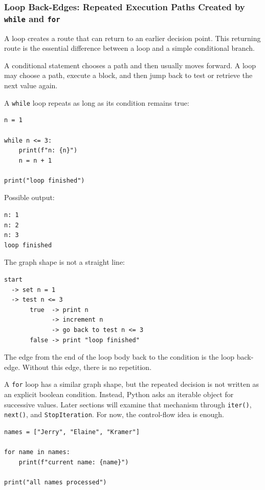\documentclass[a4paper,twoside]{report}
\begin{document}
\subsubsection{Loop Back-Edges: Repeated Execution Paths Created by \texttt{while} and \texttt{for}}

A loop creates a route that can return to an earlier decision point. This returning route is the essential difference between a loop and a simple conditional branch.

A conditional statement chooses a path and then usually moves forward. A loop may choose a path, execute a block, and then jump back to test or retrieve the next value again.

A \texttt{while} loop repeats as long as its condition remains true:

\begin{verbatim}
n = 1

while n <= 3:
    print(f"n: {n}")
    n = n + 1

print("loop finished")
\end{verbatim}

Possible output:

\begin{verbatim}
n: 1
n: 2
n: 3
loop finished
\end{verbatim}

The graph shape is not a straight line:

\begin{verbatim}
start
  -> set n = 1
  -> test n <= 3
       true  -> print n
             -> increment n
             -> go back to test n <= 3
       false -> print "loop finished"
\end{verbatim}

The edge from the end of the loop body back to the condition is the loop back-edge. Without this edge, there is no repetition.

A \texttt{for} loop has a similar graph shape, but the repeated decision is not written as an explicit boolean condition. Instead, Python asks an iterable object for successive values. Later sections will examine that mechanism through \texttt{iter()}, \texttt{next()}, and \texttt{StopIteration}. For now, the control-flow idea is enough.

\begin{verbatim}
names = ["Jerry", "Elaine", "Kramer"]

for name in names:
    print(f"current name: {name}")

print("all names processed")
\end{verbatim}
\end{document}

